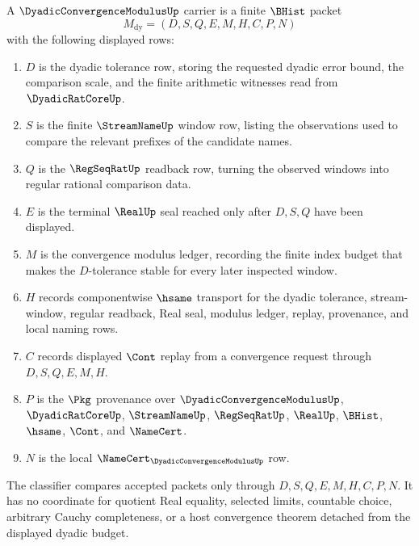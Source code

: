 \begin{definition}
\label{def:dyadic-convergence-modulus-carrier}
A $\DyadicConvergenceModulusUp$ carrier is a finite $\BHist$ packet
$$
M_{\mathrm{dy}}=(D,S,Q,E,M,H,C,P,N)
$$
with the following displayed rows:
\begin{enumerate}
\item $D$ is the dyadic tolerance row, storing the requested dyadic error bound, the comparison scale, and the finite arithmetic witnesses read from $\DyadicRatCoreUp$.
\item $S$ is the finite $\StreamNameUp$ window row, listing the observations used to compare the relevant prefixes of the candidate names.
\item $Q$ is the $\RegSeqRatUp$ readback row, turning the observed windows into regular rational comparison data.
\item $E$ is the terminal $\RealUp$ seal reached only after $D,S,Q$ have been displayed.
\item $M$ is the convergence modulus ledger, recording the finite index budget that makes the $D$-tolerance stable for every later inspected window.
\item $H$ records componentwise $\hsame$ transport for the dyadic tolerance, stream-window, regular readback, Real seal, modulus ledger, replay, provenance, and local naming rows.
\item $C$ records displayed $\Cont$ replay from a convergence request through $D,S,Q,E,M,H$.
\item $P$ is the $\Pkg$ provenance over $\DyadicConvergenceModulusUp$, $\DyadicRatCoreUp$, $\StreamNameUp$, $\RegSeqRatUp$, $\RealUp$, $\BHist$, $\hsame$, $\Cont$, and $\NameCert$.
\item $N$ is the local $\NameCert_{\DyadicConvergenceModulusUp}$ row.
\end{enumerate}
The classifier compares accepted packets only through $D,S,Q,E,M,H,C,P,N$. It has no coordinate for quotient Real equality, selected limits, countable choice, arbitrary Cauchy completeness, or a host convergence theorem detached from the displayed dyadic budget.
\end{definition}

